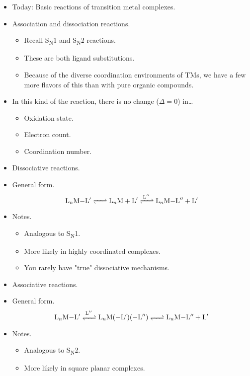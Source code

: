 \documentclass[../notes.tex]{subfiles}
\begin{document}
\begin{itemize}
    \item Today: Basic reactions of transition metal complexes.
    \item Association and dissociation reactions.
    \begin{itemize}
        \item Recall S\textsubscript{N}1 and S\textsubscript{N}2 reactions.
        \item These are both ligand substitutions.
        \item Because of the diverse coordination environments of TMs, we have a few more flavors of this than with pure organic compounds.
    \end{itemize}
    \item In this kind of the reaction, there is no change ($\Delta=0$) in\dots
    \begin{itemize}
        \item Oxidation state.
        \item Electron count.
        \item Coordination number.
    \end{itemize}
    \item Dissociative reactions.
    \item General form.
    \begin{equation*}
        \ce{L_nM-L$'$ <=> L_nM + L$'$ <=>[L$''$] L_nM-L$''$ + L$'$}
    \end{equation*}
    \item Notes.
    \begin{itemize}
        \item Analogous to S\textsubscript{N}1.
        \item More likely in highly coordinated complexes.
        \item You rarely have "true" dissociative mechanisms.
    \end{itemize}
    \item Associative reactions.
    \item General form.
    \begin{equation*}
        \ce{L_nM-L$'$ <=>[L$''$] L_nM(-L$'$)(-L$''$) <=> L_nM-L$''$ + L$'$}
    \end{equation*}
    \item Notes.
    \begin{itemize}
        \item Analogous to S\textsubscript{N}2.
        \item More likely in square planar complexes.
    \end{itemize}

\end{itemize}
\end{document}
